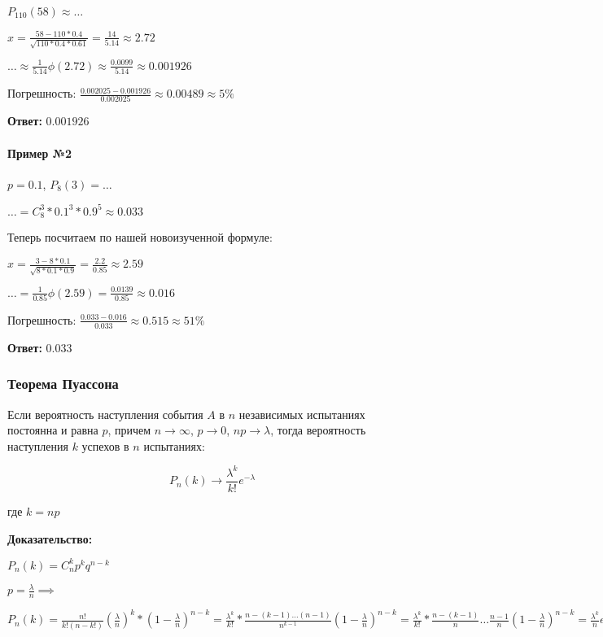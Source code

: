 \documentclass{article}
\begin{document}
$P_{110}(58) \approx \dots$

$x = \frac{58 - 110 * 0.4}{\sqrt{110 * 0.4 * 0.61}} = \frac{14}{5.14} \approx 2.72$

$\dots \approx \frac{1}{5.14} \phi(2.72) \approx \frac{0.0099}{5.14} \approx 0.001926$

Погрешность: $\frac{0.002025 - 0.001926}{0.002025} \approx 0.00489 \approx 5\%$

\textbf{Ответ:} $0.001926$

\paragraph{Пример №2}

$p = 0.1$, $P_{8}(3) = \dots$

$\dots = C_{8}^{3} * 0.1^3 * 0.9^5 \approx 0.033$

Теперь посчитаем по нашей новоизученной формуле:

$x = \frac{3 - 8 * 0.1}{\sqrt{8 * 0.1 * 0.9}} = \frac{2.2}{0.85} \approx 2.59$

$\dots = \frac{1}{0.85} \phi(2.59) = \frac{0.0139}{0.85} \approx 0.016$

Погрешность: $\frac{0.033 - 0.016}{0.033} \approx 0.515 \approx 51\%$

\textbf{Ответ:} 0.033

\subsubsection{Теорема Пуассона}

Если вероятность наступления события $A$ в $n$ независимых испытаниях постоянна и равна $p$, причем $n \rightarrow \infty$, $p \to 0$, $np \to \lambda$, тогда вероятность наступления $k$ успехов в $n$ испытаниях:

$$P_n(k) \to \frac{\lambda^k}{k!} e^{-\lambda}$$

где $k = np$

\textbf{Доказательство:}

$P_{n}(k) = C_{n}^{k} p^{k} q^{n - k}$

$p = \frac{\lambda}{n} \implies$

$P_{n}(k) = \frac{n!}{k!(n-k!)} (\frac{\lambda}{n})^{k} * (1 - \frac{\lambda}{n})^{n - k} = \frac{\lambda^{k}}{k!} * \frac{n - (k - 1) \dots (n - 1)}{n^{k - 1}} (1 - \frac{\lambda}{n})^{n - k} = \frac{\lambda^{k}}{k!} * \frac{n - (k - 1)}{n} \dots \frac{n - 1}{n} (1 - \frac{\lambda}{n})^{n - k} = \frac{\lambda^{k}}{n} e^{-\lambda}$
\end{document}

